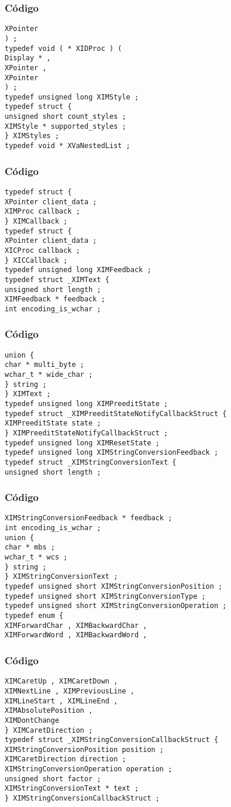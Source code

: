 \documentclass{beamer}
\begin{document}
\begin{frame}[fragile]
\frametitle{C\'odigo}
\begin{verbatim}
XPointer 
) ; 
typedef void ( * XIDProc ) ( 
Display * , 
XPointer , 
XPointer 
) ; 
typedef unsigned long XIMStyle ; 
typedef struct { 
unsigned short count_styles ; 
XIMStyle * supported_styles ; 
} XIMStyles ; 
typedef void * XVaNestedList ; 
\end{verbatim}
\end{frame}
\begin{frame}[fragile]
\frametitle{C\'odigo}
\begin{verbatim}
typedef struct { 
XPointer client_data ; 
XIMProc callback ; 
} XIMCallback ; 
typedef struct { 
XPointer client_data ; 
XICProc callback ; 
} XICCallback ; 
typedef unsigned long XIMFeedback ; 
typedef struct _XIMText { 
unsigned short length ; 
XIMFeedback * feedback ; 
int encoding_is_wchar ; 
\end{verbatim}
\end{frame}
\begin{frame}[fragile]
\frametitle{C\'odigo}
\begin{verbatim}
union { 
char * multi_byte ; 
wchar_t * wide_char ; 
} string ; 
} XIMText ; 
typedef unsigned long XIMPreeditState ; 
typedef struct _XIMPreeditStateNotifyCallbackStruct { 
XIMPreeditState state ; 
} XIMPreeditStateNotifyCallbackStruct ; 
typedef unsigned long XIMResetState ; 
typedef unsigned long XIMStringConversionFeedback ; 
typedef struct _XIMStringConversionText { 
unsigned short length ; 
\end{verbatim}
\end{frame}
\begin{frame}[fragile]
\frametitle{C\'odigo}
\begin{verbatim}
XIMStringConversionFeedback * feedback ; 
int encoding_is_wchar ; 
union { 
char * mbs ; 
wchar_t * wcs ; 
} string ; 
} XIMStringConversionText ; 
typedef unsigned short XIMStringConversionPosition ; 
typedef unsigned short XIMStringConversionType ; 
typedef unsigned short XIMStringConversionOperation ; 
typedef enum { 
XIMForwardChar , XIMBackwardChar , 
XIMForwardWord , XIMBackwardWord , 
\end{verbatim}
\end{frame}
\begin{frame}[fragile]
\frametitle{C\'odigo}
\begin{verbatim}
XIMCaretUp , XIMCaretDown , 
XIMNextLine , XIMPreviousLine , 
XIMLineStart , XIMLineEnd , 
XIMAbsolutePosition , 
XIMDontChange 
} XIMCaretDirection ; 
typedef struct _XIMStringConversionCallbackStruct { 
XIMStringConversionPosition position ; 
XIMCaretDirection direction ; 
XIMStringConversionOperation operation ; 
unsigned short factor ; 
XIMStringConversionText * text ; 
} XIMStringConversionCallbackStruct ; 
\end{verbatim}
\end{frame}
\end{document}
